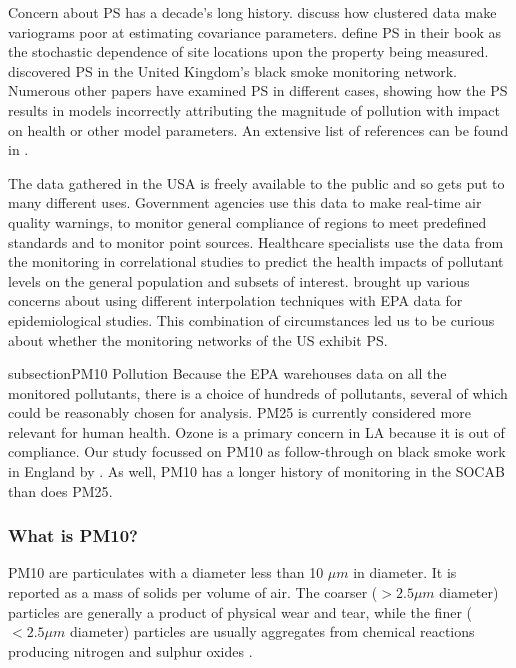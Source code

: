 \documentclass{article}
\begin{document}
	Concern about \ac{PS} has a decade's long history. \citet{isaaks1988spatial} discuss how clustered data make variograms poor at estimating covariance parameters. \cite{diggle:07} define \ac{PS} in their book as the stochastic dependence of site locations upon the property being measured. \cite{shaddick2012preferential} discovered  \ac{PS} in the United Kingdom's black smoke monitoring network. Numerous other papers have examined \ac{PS} in different cases, showing how the \ac{PS} results in models incorrectly attributing the magnitude of pollution with impact on health or other model parameters.  An extensive list of references can be found in \citep{Zidek:2012}.  
	
	The data gathered in the USA is freely available to the public and so gets put to many different uses.  Government agencies use this data to make real-time air quality warnings, to monitor general compliance of regions to meet predefined standards and to monitor point sources.  Healthcare specialists use the data from the monitoring in correlational studies to predict the health impacts of pollutant levels on the general population and subsets of interest.  \cite{wong2004comparison} brought up various concerns about using different interpolation techniques with \ac{EPA} data for epidemiological studies.  This combination of circumstances led us to be curious about whether the monitoring networks of the US exhibit \ac{PS}.
	
	
	subsection{PM10 Pollution}
	\label{sec:pm10}
	Because the \ac{EPA} warehouses data on all the monitored pollutants, there is a choice of hundreds of pollutants, several of which could be reasonably chosen for analysis.  \ac{PM25} is currently considered more relevant for human health.  Ozone is a primary concern in LA because it is out of compliance.   Our study focussed on \ac{PM10} as follow-through on black smoke work in England by \cite{zidek2010monitoring}.  As well, \ac{PM10} has a longer history of monitoring in the \ac{SOCAB} than does \ac{PM25}.
	
	\subsubsection*{What is PM10?}
	\label{subsubsec:pm10nature}
	\ac{PM10} are particulates with a diameter less than 10 $\mu m$ in diameter.  It is reported as a mass of solids per volume of air.  The coarser ($> 2.5 \mu m$ diameter) particles are generally a product of physical wear and tear, while the finer ($< 2.5 \mu m$ diameter) particles are usually aggregates from chemical reactions producing nitrogen and sulphur oxides
	.
	
\end{document}

